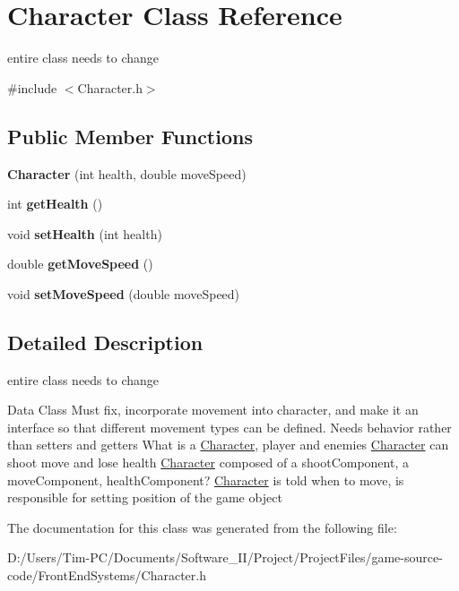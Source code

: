 \hypertarget{class_character}{}\section{Character Class Reference}
\label{class_character}


entire class needs to change  




{\ttfamily \#include $<$Character.\+h$>$}

\subsection*{Public Member Functions}
\begin{DoxyCompactItemize}
\item 
\mbox{\label{class_character_a888669b1ef81595716c493140b4fd631}} 
{\bfseries Character} (int health, double move\+Speed)
\item 
\mbox{\label{class_character_ae24a44b8a22d0727dd4e2c46a1df66f5}} 
int {\bfseries get\+Health} ()
\item 
\mbox{\label{class_character_afd06ab5d08a0edc75539f3586ccac66d}} 
void {\bfseries set\+Health} (int health)
\item 
\mbox{\label{class_character_a93daa12dd217ac297c29821e3a0c7907}} 
double {\bfseries get\+Move\+Speed} ()
\item 
\mbox{\label{class_character_a4c25224267e2c0d6ae391223b2313d49}} 
void {\bfseries set\+Move\+Speed} (double move\+Speed)
\end{DoxyCompactItemize}


\subsection{Detailed Description}
entire class needs to change 

Data Class Must fix, incorporate movement into character, and make it an interface so that different movement types can be defined. Needs behavior rather than setters and getters What is a \hyperlink{class_character}{Character}, player and enemies \hyperlink{class_character}{Character} can shoot move and lose health \hyperlink{class_character}{Character} composed of a shoot\+Component, a move\+Component, health\+Component? \hyperlink{class_character}{Character} is told when to move, is responsible for setting position of the game object 

The documentation for this class was generated from the following file\+:\begin{DoxyCompactItemize}
\item 
D\+:/\+Users/\+Tim-\/\+P\+C/\+Documents/\+Software\+\_\+\+I\+I/\+Project/\+Project\+Files/game-\/source-\/code/\+Front\+End\+Systems/Character.\+h\end{DoxyCompactItemize}

